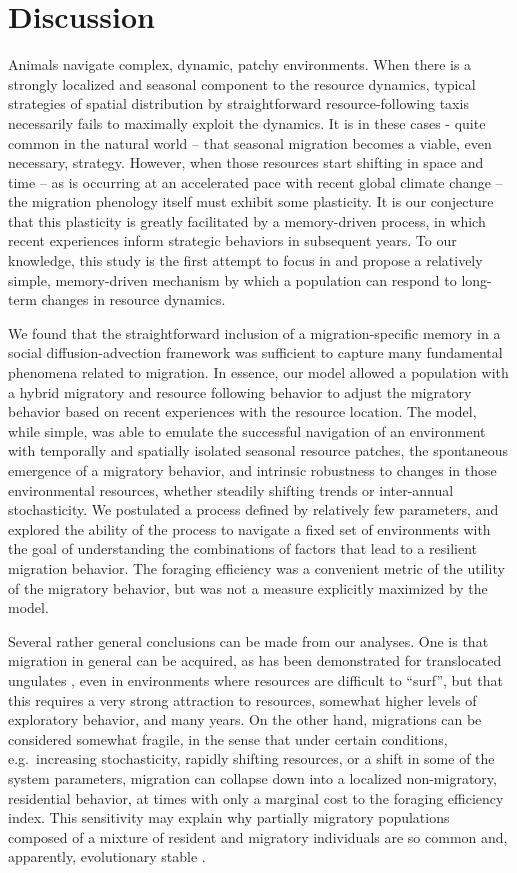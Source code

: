 \documentclass[12pt]{article}
\begin{document}
\section{Discussion}

Animals navigate complex, dynamic, patchy environments. When there is a strongly localized and seasonal component to the resource dynamics, typical strategies of spatial distribution by straightforward resource-following taxis necessarily fails to maximally exploit the dynamics. It is in these cases - quite common in the natural world -- that seasonal migration becomes a viable, even necessary, strategy. However, when those resources start shifting in space and time -- as is occurring at an accelerated pace with recent global climate change -- the migration phenology itself must exhibit some plasticity. It is our conjecture that this plasticity is greatly facilitated by a memory-driven process, in which recent experiences inform strategic behaviors in subsequent years. To our knowledge, this study is the first attempt to focus in and propose a relatively simple, memory-driven mechanism by which a population can respond to long-term changes in resource dynamics.

We found that the straightforward inclusion of a migration-specific memory in a social diffusion-advection framework was sufficient to capture many fundamental phenomena related to migration. In essence, our model allowed a population with a hybrid migratory and resource following behavior to adjust the migratory behavior based on recent experiences with the resource location. The model, while simple, was able to emulate the successful navigation of an environment with temporally and spatially isolated seasonal resource patches, the spontaneous emergence of a migratory behavior, and intrinsic robustness to changes in those environmental resources, whether steadily shifting trends or inter-annual stochasticity. We postulated a process defined by relatively few parameters, and explored the ability of the process to navigate a fixed set of environments with the goal of understanding the combinations of factors that lead to a resilient migration behavior. The foraging efficiency was a convenient metric of the utility of the migratory behavior, but was not a measure explicitly maximized by the model.

Several rather general conclusions can be made from our analyses. One is that migration in general can be acquired, as has been demonstrated for translocated ungulates \citep{Jesmer2018}, even in environments where resources are difficult to ``surf'', but that this requires a very strong attraction to resources, somewhat higher levels of exploratory behavior, and many years. On the other hand, migrations can be considered somewhat fragile, in the sense that under certain conditions, e.g.~increasing stochasticity, rapidly shifting resources, or a shift in some of the system parameters, migration can collapse down into a localized non-migratory, residential behavior, at times with only a marginal cost to the foraging efficiency index. This sensitivity may explain why partially migratory populations composed of a mixture of resident and migratory individuals are so common and, apparently, evolutionary stable \citep{Berthold1999, Chapman2011}.
\end{document}
